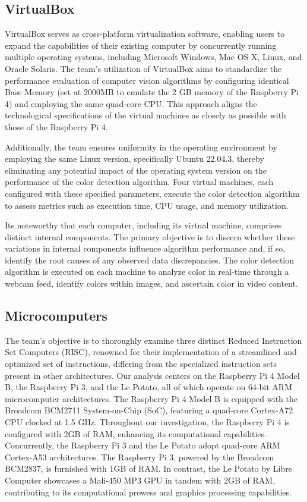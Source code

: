 \subsection{VirtualBox}

VirtualBox serves as cross-platform virtualization software, enabling
users to expand the capabilities of their existing computer by
concurrently running multiple operating systems, including Microsoft
Windows, Mac OS X, Linux, and Oracle Solaris. The team's utilization of
VirtualBox aims to standardize the performance evaluation of computer
vision algorithms by configuring identical Base Memory (set at 2000MB to
emulate the 2 GB memory of the Raspberry Pi 4) and employing the same
quad-core CPU. This approach aligns the technological specifications of
the virtual machines as closely as possible with those of the Raspberry
Pi 4.

Additionally, the team ensures uniformity in the operating environment by
employing the same Linux version, specifically Ubuntu 22.04.3, thereby
eliminating any potential impact of the operating system version on the
performance of the color detection algorithm. Four virtual machines,
each configured with these specified parameters, execute the color
detection algorithm to assess metrics such as execution time, CPU usage,
and memory utilization.

It\textquotesingle s noteworthy that each computer, including its
virtual machine, comprises distinct internal components. The primary
objective is to discern whether these variations in internal components
influence algorithm performance and, if so, identify the root causes of
any observed data discrepancies. The color detection algorithm is
executed on each machine to analyze color in real-time through a webcam
feed, identify colors within images, and ascertain color in video
content.

\subsection{Microcomputers}

The team's objective is to thoroughly examine three distinct Reduced Instruction Set Computers (RISC), renowned for their implementation of a streamlined and optimized set of instructions, differing from the specialized instruction sets present in other architectures. Our analysis centers on the Raspberry Pi 4 Model B, the Raspberry Pi 3, and the Le Potato, all of which operate on 64-bit ARM microcomputer architectures. The Raspberry Pi 4 Model B is equipped with the Broadcom BCM2711 System-on-Chip (SoC), featuring a quad-core Cortex-A72 CPU clocked at 1.5 GHz. Throughout our investigation, the Raspberry Pi 4 is configured with 2GB of RAM, enhancing its computational capabilities. Concurrently, the Raspberry Pi 3 and the Le Potato adopt quad-core ARM Cortex-A53 architectures. The Raspberry Pi 3, powered by the Broadcom BCM2837, is furnished with 1GB of RAM. In contrast, the Le Potato by Libre Computer showcases a Mali-450 MP3 GPU in tandem with 2GB of RAM, contributing to its computational prowess and graphics processing capabilities.

